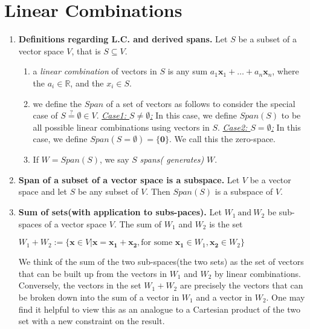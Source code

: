 \documentclass[oneside, 12pt]{book}
\newcommand{\settag}[1]{\renewcommand{\theenumi}{#1}}
\newcommand{\R}{\mathbb{R}}
\newcommand{\tit}[1]{\textit{#1}}
\begin{document}
\section{Linear Combinations}
    \begin{enumerate}
        \settag{1.3.1}
        \item \textbf{Definitions regarding L.C. and derived spans.} Let $S$ be a subset of a vector space $V$, that is $S\subseteq V$.
        \begin{enumerate}
            \item a \textit{linear combination} of vectors in $S$ is any sum $a_1\mathbf{x}_1 + \ldots + a_n\mathbf{x}_n$, where the $a_i \in \R$, and the $x_i \in S$.
            \item we define the $Span$ of a set of vectors as follows to consider the special case of $S\stackrel{?}{=}\emptyset \in V$.
            \newline \underline{\tit{Case1: $S\neq \emptyset$:}} In this case, we define $Span(S)$ to be all possible linear combinations using vectors in $S$.\newline
            \underline{\tit{Case2: $S= \emptyset$:}} In this case, we define $Span(S = \emptyset)=\{\mathbf{0}\}$. We call this the zero-space.
            
            \item If $W=Span(S)$, we say $S$ \textit{spans( generates)} $W$.
        \end{enumerate}
        
        \settag{1.3.4}
        \item \textbf{Span of a  subset of a vector space is a subspace.} Let $V$ be a vector space and let $S$ be any subset of $V$. Then $Span(S)$ is a subspace of $V$.
        
        \settag{1.3.5}
        \item \textbf{Sum of sets(with application to subs-paces).} Let $W_1~\text{and}~W_2$ be sub-spaces of a vector space $V$. The sum of $W_1$ and $W_2$ is the set
        \begin{center}
            $W_1+W_2 :=\{\mathbf{x}\in V |\mathbf{x}=\mathbf{x_1}+\mathbf{x_2}, \text{for some } \mathbf{x_1}\in W_1, \mathbf{x_2} \in W_2\}$
        \end{center}
        We think of the sum of the two sub-spaces(the two sets) as the set of vectors that can be built up from the vectors in $W_1$ and $W_2$ by linear combinations. Conversely, the vectors in the set $W_1+W_2$ are precisely the vectors that can be broken down into the sum of a vector in $W_1$ and a vector in $W_2$. One may find it helpful to view this as an analogue to a Cartesian product of the two set with a new constraint on the result.
        

\end{enumerate}
\end{document}
